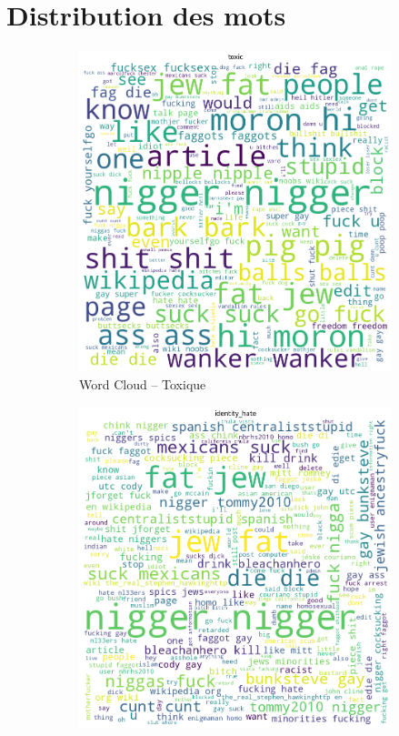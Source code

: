 \section{Distribution des mots}
\begin{figure}[h]
    \centering
    \begin{subfigure}{.5\textwidth}
        \centering
        \includegraphics[width=.9\linewidth]{figures/word-cloud-toxic.png}
        \caption{Word Cloud – Toxique}
    \end{subfigure}%
    \begin{subfigure}{.5\textwidth}
        \centering
        \includegraphics[width=.9\linewidth]{figures/word-cloud-identity-hate.png}

\end{subfigure}
\end{figure}
